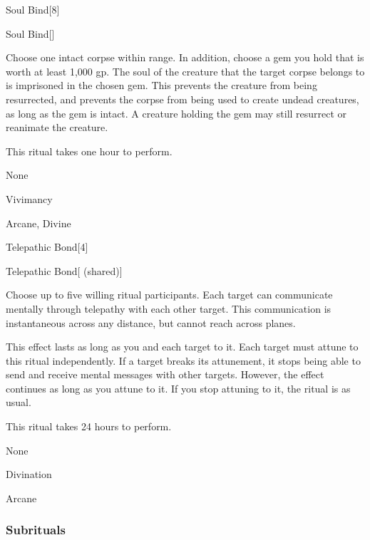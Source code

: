 \begin{spellsection}{Soul Bind}[8]


\begin{ability}{Soul Bind}[]

Choose one intact corpse within \rngclose range.
In addition, choose a gem you hold that is worth at least 1,000 gp.
The soul of the creature that the target corpse belongs to is imprisoned in the chosen gem.
This prevents the creature from being resurrected, and prevents the corpse from being used to create undead creatures, as long as the gem is intact.
A creature holding the gem may still resurrect or reanimate the creature.

This ritual takes one hour to perform.

\end{ability}


 None

 Vivimancy

 Arcane, Divine
\end{spellsection}


\begin{spellsection}{Telepathic Bond}[4]


\begin{ability}{Telepathic Bond}[ (shared)]

Choose up to five willing ritual participants.
Each target can communicate mentally through telepathy with each other target.
This communication is instantaneous across any distance, but cannot reach across planes.

This effect lasts as long as you and each target  to it.
Each target must attune to this ritual independently.
If a target breaks its attunement, it stops being able to send and receive mental messages with other targets.
However, the effect continues as long as you attune to it.
If you stop attuning to it, the ritual is  as usual.

This ritual takes 24 hours to perform.

\end{ability}


 None

 Divination

 Arcane
\end{spellsection}


\subsubsection{Subrituals}


